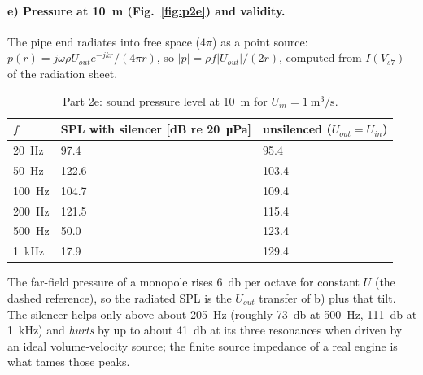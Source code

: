 \documentclass[a4paper,11pt]{article}
\newcommand{\jw}{j\omega}
\begin{document}
\paragraph{e) Pressure at \SI{10}{\metre} (Fig.~\ref{fig:p2e}) and validity.} The pipe end radiates into free space
($4\pi$) as a point source: $p(r) = \jw\rho U_{out}e^{-jkr}/(4\pi r)$, so $|p| = \rho f|U_{out}|/(2r)$, computed from
$I(V_{s7})$ of the radiation sheet.
\begin{table}[H]\centering\small
\begin{tabular}{@{}lll@{}}\toprule
$f$ & SPL with silencer [dB re \SI{20}{\micro\pascal}] & unsilenced ($U_{out} = U_{in}$) \\ \midrule
\SI{20}{\hertz} & 97.4 & 95.4 \\
\SI{50}{\hertz} & 122.6 & 103.4 \\
\SI{100}{\hertz} & 104.7 & 109.4 \\
\SI{200}{\hertz} & 121.5 & 115.4 \\
\SI{500}{\hertz} & 50.0 & 123.4 \\
\SI{1}{\kilo\hertz} & 17.9 & 129.4 \\
\bottomrule\end{tabular}
\caption{Part 2e: sound pressure level at \SI{10}{\metre} for $U_{in} = \SI{1}{\cubic\metre\per\second}$.}
\end{table}
The far-field pressure of a monopole rises \SI{6}{\decibel} per octave for constant $U$ (the dashed reference), so the
radiated SPL is the $U_{out}$ transfer of b) plus that tilt. The silencer helps only above about \SI{205}{\hertz}
(roughly \SI{73}{\decibel} at \SI{500}{\hertz}, \SI{111}{\decibel} at \SI{1}{\kilo\hertz}) and \emph{hurts} by up to
about \SI{41}{\decibel} at its three resonances when driven by an ideal volume-velocity source; the finite source
impedance of a real engine is what tames those peaks.
\end{document}
